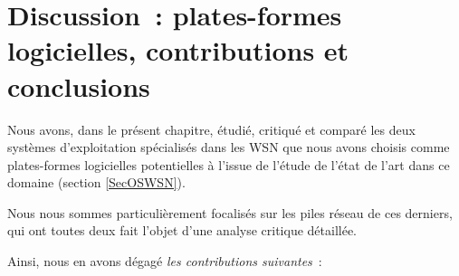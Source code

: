 \section{Discussion~: plates-formes logicielles,
         contributions et conclusions}

Nous avons, dans le présent chapitre, étudié, critiqué et comparé les
deux systèmes d'exploitation spécialisés dans les WSN que nous avons choisis
comme plates-formes logicielles potentielles à l'issue de l'étude de l'état
de l'art dans ce domaine (section \vref{SecOSWSN}).

Nous nous sommes particulièrement focalisés sur les piles réseau de ces
derniers, qui ont toutes deux fait l'objet d'une analyse critique détaillée.

Ainsi, nous en avons dégagé \emph{les contributions suivantes}~:

